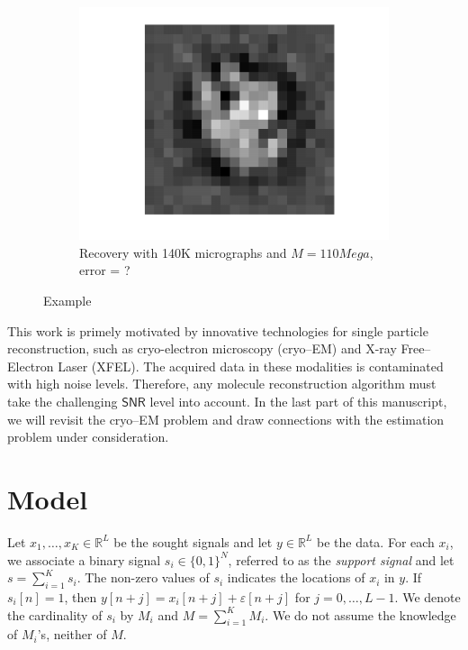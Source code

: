 \documentclass[english]{article}
\numberwithin{equation}{section}
\theoremstyle{plain}
\theoremstyle{definition}
\theoremstyle{remark}
\theoremstyle{plain}
\theoremstyle{remark}
\theoremstyle{plain}
\theoremstyle{plain}
\newcommand{\RL}{\mathbb{R}^L}
\newcommand{\RN}{\mathbb{R}^L}
\newcommand{\SNR}{{\textsf{SNR}}}
\begin{document}
\begin{figure}[ht!]
\begin{subfigure}{.5\textwidth}
	\includegraphics[scale=0.5]{signal2D_LS_exp1}
	\caption{Recovery with 140K micrographs and $M = 110Mega$, error = ? }
	\label{fig:signal2D_RRR}
\end{subfigure}

\caption{Example}
\label{fig:example}
\end{figure}



This work is primely motivated by  innovative technologies for single particle reconstruction, such as cryo-electron microscopy (cryo--EM) and X-ray Free--Electron Laser (XFEL). The acquired data in these modalities is contaminated with high noise levels. Therefore, any molecule reconstruction algorithm must take  the challenging $\SNR$ level into account.  In the last part of this manuscript, we will revisit the cryo--EM problem and draw connections with the estimation problem under consideration.


\section{Model}  \label{sec:model}

Let $x_1,\ldots,x_K\in\RL$ be the sought signals and let $y\in\RN$ be the data. For each $x_i$, we associate a binary signal  $s_i\in\{0,1\}^N$, referred to as the \emph{support signal} and let $s = \sum_{i=1}^Ks_i$. The non-zero values of $s_i$ indicates the locations of $x_i$ in $y$. If $s_i[n]=1$, then $y[n+j] = x_i[n+j]+\varepsilon[n+j]$ for $j=0,\ldots,L-1$.
We denote the cardinality of $s_i$ by $M_i$  and $M = \sum_{i=1}^{K}M_i$. We do not assume the knowledge of $M_i$'s, neither of $M$.
\end{document}
